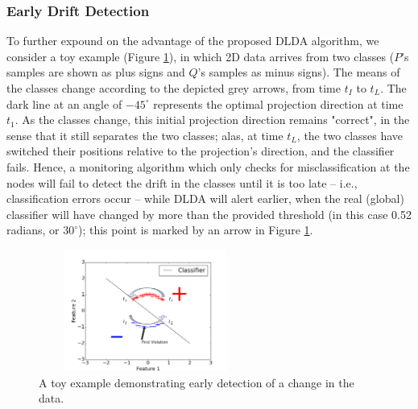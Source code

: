 %

%
\subsubsection{Early Drift Detection}
\label{sec:earlydetection}
%
%
To further expound on the advantage of the proposed DLDA algorithm, we consider 
a toy example (Figure \ref{EarlyDetection}), 
in which 2D data arrives from two classes ($P$'s samples are shown as plus signs 
and $Q$'s samples as minus signs). The means of the classes change 
according to the depicted grey arrows, from time $t_I$ to $t_L$. The dark
line at an angle of $-45^{\circ}$ represents the optimal projection
direction at time $t_1$. As the classes change, this initial projection
direction remains "correct", in the sense that it still separates the
two classes; alas, at time $t_L$, the two classes have switched their
positions relative to the projection's direction, and the classifier
fails. Hence, a monitoring algorithm which only checks for misclassification
at the nodes will fail to detect the drift in the classes until it is too
late -- i.e., classification errors occur -- while DLDA will alert earlier, 
when the real (global) classifier will have changed by more than the
provided threshold (in this case 0.52 radians, or $30^{\circ}$); this point
is marked by an arrow in Figure \ref{EarlyDetection}.
%
%
\begin{figure}
	\centering
	\includegraphics[width=7cm, height=40mm]{graphics/EarlyDetection.png}
	\caption{A toy example demonstrating early detection of a change in the data.
	\label{EarlyDetection}}
\end{figure}
%
%
